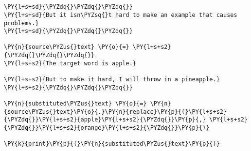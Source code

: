 

\section*{}

\begin{Verbatim}[commandchars=\\\{\}]
\PY{l+s+sd}{\PYZdq{}\PYZdq{}\PYZdq{}}
\PY{l+s+sd}{But it isn\PYZsq{}t hard to make an example that causes problems.}
\PY{l+s+sd}{\PYZdq{}\PYZdq{}\PYZdq{}}

\PY{n}{source\PYZus{}text} \PY{o}{=} \PY{l+s+s2}{\PYZdq{}\PYZdq{}\PYZdq{}}
\PY{l+s+s2}{The target word is apple.}

\PY{l+s+s2}{But to make it hard, I will throw in a pineapple.}
\PY{l+s+s2}{\PYZdq{}\PYZdq{}\PYZdq{}}

\PY{n}{substituted\PYZus{}text} \PY{o}{=} \PY{n}{source\PYZus{}text}\PY{o}{.}\PY{n}{replace}\PY{p}{(}\PY{l+s+s2}{\PYZdq{}}\PY{l+s+s2}{apple}\PY{l+s+s2}{\PYZdq{}}\PY{p}{,} \PY{l+s+s2}{\PYZdq{}}\PY{l+s+s2}{orange}\PY{l+s+s2}{\PYZdq{}}\PY{p}{)}

\PY{k}{print}\PY{p}{(}\PY{n}{substituted\PYZus{}text}\PY{p}{)}
\end{Verbatim}

